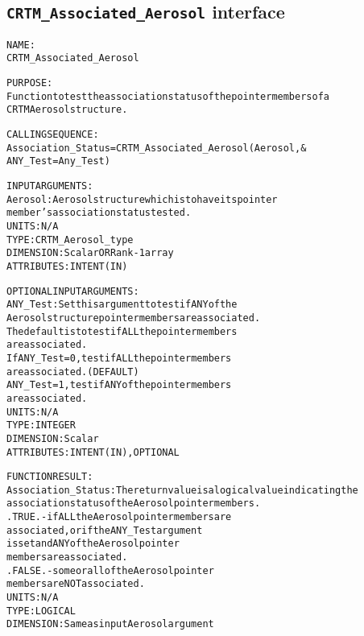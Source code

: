 \subsection{\texttt{CRTM\_Associated\_Aerosol} interface}
  \label{sec:CRTM_Associated_Aerosol_interface}
  \begin{alltt}
 
  NAME:
        CRTM_Associated_Aerosol
 
  PURPOSE:
        Function to test the association status of the pointer members of a
        CRTM Aerosol structure.
 
  CALLING SEQUENCE:
        Association_Status = CRTM_Associated_Aerosol( Aerosol          , &
                                                      ANY_Test=Any_Test  )
 
  INPUT ARGUMENTS:
        Aerosol:             Aerosol structure which is to have its pointer
                             member's association status tested.
                             UNITS:      N/A
                             TYPE:       CRTM_Aerosol_type
                             DIMENSION:  Scalar OR Rank-1 array
                             ATTRIBUTES: INTENT(IN)
 
  OPTIONAL INPUT ARGUMENTS:
        ANY_Test:            Set this argument to test if ANY of the
                             Aerosol structure pointer members are associated.
                             The default is to test if ALL the pointer members
                             are associated.
                             If ANY_Test = 0, test if ALL the pointer members
                                              are associated.  (DEFAULT)
                                ANY_Test = 1, test if ANY of the pointer members
                                              are associated.
                             UNITS:      N/A
                             TYPE:       INTEGER
                             DIMENSION:  Scalar
                             ATTRIBUTES: INTENT(IN), OPTIONAL
 
  FUNCTION RESULT:
        Association_Status:  The return value is a logical value indicating the
                             association status of the Aerosol pointer members.
                             .TRUE.  - if ALL the Aerosol pointer members are
                                       associated, or if the ANY_Test argument
                                       is set and ANY of the Aerosol pointer
                                       members are associated.
                             .FALSE. - some or all of the Aerosol pointer
                                       members are NOT associated.
                             UNITS:      N/A
                             TYPE:       LOGICAL
                             DIMENSION:  Same as input Aerosol argument
 
  \end{alltt}
